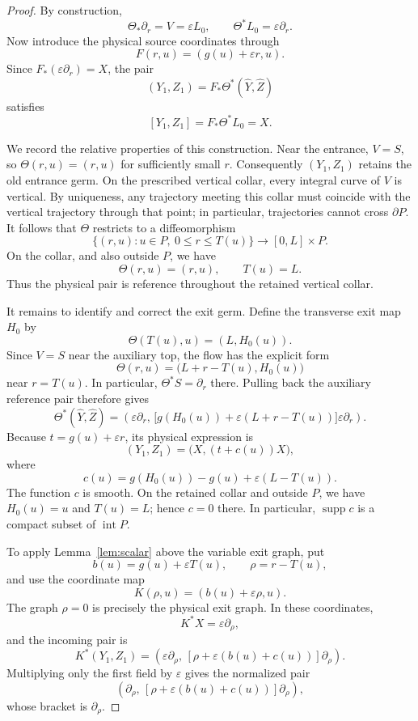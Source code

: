 \documentclass[11pt]{article}
\theoremstyle{remark}
\begin{document}
\begin{proof}
By construction,
$$
    \Theta_*\partial_r=V=\varepsilon L_0,
    \qquad
    \Theta^*L_0=\varepsilon\partial_r.
$$
Now introduce the physical source coordinates through
$$
    F(r,u)=(g(u)+\varepsilon r,u).
$$
Since $F_*(\varepsilon\partial_r)=X$, the pair
$$
    (Y_1,Z_1)=F_*\Theta^*(\widehat Y,\widehat Z)
$$
satisfies
$$
    [Y_1,Z_1]
    =
    F_*\Theta^*L_0
    =
    X.
$$

We record the relative properties of this construction. Near the entrance, $V=S$, so $\Theta(r,u)=(r,u)$ for sufficiently small $r$. Consequently $(Y_1,Z_1)$ retains the old entrance germ. On the prescribed vertical collar, every integral curve of $V$ is vertical. By uniqueness, any trajectory meeting this collar must coincide with the vertical trajectory through that point; in particular, trajectories cannot cross $\partial P$. It follows that $\Theta$ restricts to a diffeomorphism
$$
    \{(r,u):u\in P,\ 0\le r\le T(u)\}
    \longrightarrow
    [0,L]\times P.
$$
On the collar, and also outside $P$, we have
$$
    \Theta(r,u)=(r,u),
    \qquad
    T(u)=L.
$$
Thus the physical pair is reference throughout the retained vertical collar.

It remains to identify and correct the exit germ. Define the transverse exit map $H_0$ by
$$
    \Theta(T(u),u)=(L,H_0(u)).
$$
Since $V=S$ near the auxiliary top, the flow has the explicit form
$$
    \Theta(r,u)=\bigl(L+r-T(u),H_0(u)\bigr)
$$
near $r=T(u)$. In particular, $\Theta^*S=\partial_r$ there.
Pulling back the auxiliary reference pair therefore gives
$$
    \Theta^*(\widehat Y,\widehat Z)
    =
    \left(
        \varepsilon\partial_r,\,
        \bigl[g(H_0(u))+\varepsilon(L+r-T(u))\bigr]
        \varepsilon\partial_r
    \right).
$$
Because $t=g(u)+\varepsilon r$, its physical expression is
$$
    (Y_1,Z_1)=\bigl(X,(t+c(u))X\bigr),
$$
where
\begin{equation}\label{eq:defect}\tag{4.3}
    c(u)=g(H_0(u))-g(u)+\varepsilon(L-T(u)).
\end{equation}
The function $c$ is smooth. On the retained collar and outside $P$, we have $H_0(u)=u$ and $T(u)=L$; hence $c=0$ there. In particular, $\operatorname{supp}c$ is a compact subset of $\operatorname{int}P$.

To apply Lemma~\ref{lem:scalar} above the variable exit graph, put
$$
    b(u)=g(u)+\varepsilon T(u),
    \qquad
    \rho=r-T(u),
$$
and use the coordinate map
$$
    K(\rho,u)=(b(u)+\varepsilon\rho,u).
$$
The graph $\rho=0$ is precisely the physical exit graph. In these coordinates,
$$
    K^*X=\varepsilon\partial_\rho,
$$
and the incoming pair is
$$
    K^*(Y_1,Z_1)
    =
    \left(
        \varepsilon\partial_\rho,\,
        [\rho+\varepsilon(b(u)+c(u))]\partial_\rho
    \right).
$$
Multiplying only the first field by $\varepsilon$ gives the normalized
pair
$$
    \left(
        \partial_\rho,\,
        [\rho+\varepsilon(b(u)+c(u))]\partial_\rho
    \right),
$$
whose bracket is $\partial_\rho$.


\end{proof}
\end{document}
